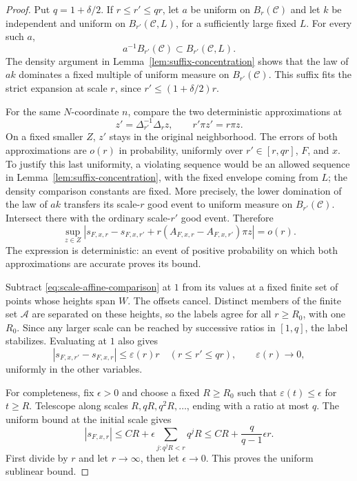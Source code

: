 \begin{proof}
Put $q=1+\delta/2$.  If $r\le r'\le qr$, let $a$ be uniform on
$B_r(\mathcal C)$ and let $k$ be independent and uniform on
$B_{r'}(\mathcal C,L)$, for a sufficiently large fixed $L$.
For every such $a$,
\[
 a^{-1}B_{r'}(\mathcal C)\subset B_{r'}(\mathcal C,L).
\]
The density argument in Lemma~\ref{lem:suffix-concentration} shows
that the law of $ak$ dominates a fixed multiple of uniform measure
on $B_{r'}(\mathcal C)$.  This suffix fits the strict expansion at
scale $r$, since $r'\le(1+\delta/2)r$.

For the same $N$-coordinate $n$, compare the two deterministic
approximations at
\[
 z'=\Delta_{r'}^{-1}\Delta_rz,
 \qquad r'\pi z'=r\pi z.
\]
On a fixed smaller $Z$, $z'$ stays in the original neighborhood.
The errors of both approximations are $o(r)$ in probability,
uniformly over $r'\in[r,qr]$, $F$, and $x$.  To justify this last
uniformity, a violating sequence would be an allowed sequence in
Lemma~\ref{lem:suffix-concentration}, with the fixed envelope coming
from $L$; the density comparison constants are fixed.
More precisely, the lower domination of the law of $ak$ transfers
its scale-$r$ good event to uniform measure on $B_{r'}(\mathcal C)$.
Intersect there with the ordinary scale-$r'$ good event.
Therefore
\begin{equation}
\label{eq:scale-affine-comparison}
 \sup_{z\in Z}
 \left|s_{F,x,r}-s_{F,x,r'}
       +r(A_{F,x,r}-A_{F,x,r'})\pi z\right|=o(r).
\end{equation}
The expression is deterministic: an event of positive probability
on which both approximations are accurate proves its bound.

Subtract \eqref{eq:scale-affine-comparison} at $1$ from its values
at a fixed finite set of points whose heights span $W$.
The offsets cancel.  Distinct members of the finite set $\mathcal A$
are separated on these heights, so the labels agree for all
$r\ge R_0$, with one $R_0$.  Since any larger scale can be reached
by successive ratios in $[1,q]$, the label stabilizes.
Evaluating at $1$ also gives
\[
 |s_{F,x,r'}-s_{F,x,r}|\le\varepsilon(r)r
 \quad(r\le r'\le qr),\qquad \varepsilon(r)\longrightarrow0,
\]
uniformly in the other variables.

For completeness, fix $\epsilon>0$ and choose a fixed $R\ge R_0$
such that $\varepsilon(t)\le\epsilon$ for $t\ge R$.
Telescope along scales $R,qR,q^2R,\ldots$, ending with a ratio
at most $q$.  The uniform bound at the initial scale gives
\[
 |s_{F,x,r}|
 \le CR+\epsilon\sum_{j:q^jR<r}q^jR
 \le CR+\frac{q}{q-1}\epsilon r.
\]
First divide by $r$ and let $r\to\infty$, then let $\epsilon\to0$.
This proves the uniform sublinear bound.
\end{proof}


